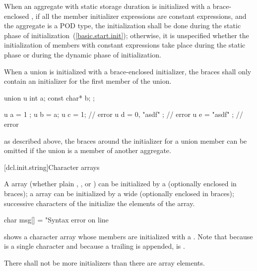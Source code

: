 \pnum
When an aggregate with static storage duration is initialized with a
brace-enclosed , if all the member
initializer expressions are constant expressions, and the aggregate is a
POD type, the initialization shall be done during the static phase of
initialization~(\ref{basic.start.init}); otherwise, it is unspecified
whether the initialization of members with constant expressions take
place during the static phase or during the dynamic phase of initialization.

\pnum
{}%
When a union is initialized with a brace-enclosed initializer,
the braces shall only contain an
initializer
for the first member of the union.
\enterexample

\begin{codeblock}
union u { int a; const char* b; };

u a = { 1 };
u b = a;
u c = 1;                        // error
u d = { 0, "asdf" };            // error
u e = { "asdf" };               // error
\end{codeblock}
\exitexampleb
\enternote
as described above,
the braces around the initializer
for a union member can be omitted if the
union is a member of another aggregate.
\exitnote

[dcl.init.string]{Character arrays}%

\pnum
A
array (whether plain
,
,
or
)
can be initialized by a
 (optionally enclosed in braces);
a
array can be initialized by a wide
 (optionally enclosed in braces);
%
successive
characters of the
initialize the elements of the array.
\enterexample

\begin{codeblock}
char msg[] = "Syntax error on line %
\end{codeblock}

shows a character array whose members are initialized
with a
.
Note that because
is a single character and
because a trailing
is appended,
is
.
\exitexample

\pnum
There shall not be more initializers than there are array elements.
\enterexample


